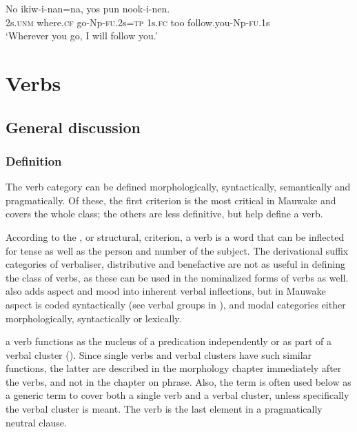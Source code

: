 \ea%
\label{ex:3:x1869}
\gll No  ikiw-i-nan=na, yos pun nook-i-nen. \\
2s.\textsc{unm} where.\textsc{cf} go-Np-\textsc{fu}.2s=\textsc{tp} 1s.\textsc{fc} too follow.you-Np-\textsc{fu}.1s\\
\glt`Wherever you go, I will follow you.'
\z

\section{Verbs}\label{sec:3:8}
{}
\subsection{General discussion}\label{sec:3:y:x}
{}
\subsubsection{Definition}\label{sec:3:z:y:x}
{}
The verb category can be defined morphologically, syntactically, semantically and pragmatically. Of these, the first criterion is the most critical in Mauwake and covers the whole class; the others are less definitive, but help define a  verb.

According to the , or structural, criterion, a verb is a word that can be inflected for tense as well as the person and number of the subject. The derivational suffix categories of verbaliser, distributive and benefactive are not as useful in defining the class of verbs, as these can be used in the nominalized forms of verbs as well. \citet[190]{Anderson1985b} also adds aspect and mood into inherent verbal inflections, but in Mauwake aspect is coded syntactically (see verbal groups in ), and modal categories either morphologically, syntactically or lexically.

 a verb functions as the nucleus of a predication independently or as part of a verbal cluster (). Since single verbs and verbal clusters have such similar functions, the latter are described in the morphology chapter immediately after the verbs, and not in the chapter on phrase. Also, the term  is often used below as a generic term to cover both a single verb and a verbal cluster, unless specifically the verbal cluster is meant. The verb is the last element in a pragmatically neutral clause.

